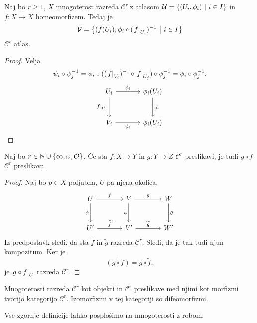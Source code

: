 \begin{trditev}
Naj bo $r \geq 1$, $X$ mnogoterost razreda $\mathcal{C}^r$ z
atlasom $\mathcal{U} = \left\{(U_i, \phi_i)~\middle\vert~i \in I\right\}$ in
$f \colon X \to X$ homeomorfizem. Tedaj je
\[
\mathcal{V} =
\left\{(f(U_i), \phi_i \circ (\left. f\right|_{U_i}^{})^{-1}~\middle\vert~i \in I\right\}
\]
$\mathcal{C}^r$ atlas.
\end{trditev}

\begin{proof}
Velja
\[
\psi_i \circ \psi_j^{-1} = \phi_i \circ
((\left. f\right|_{V_i}^{})^{-1} \circ \left. f\right|_{U_j}^{}) \circ \phi_j^{-1} =
\phi_i \circ \phi_j^{-1}.
\qedhere
\]
\[
\begin{tikzcd}[column sep=large, row sep=large]
U_i \arrow[r, "\phi_i"] \arrow[d, "\eval{f}{U_i}{}"'] &
\phi_i(U_i) \arrow[d, "\id"]
\\
V_i \arrow[r, rightarrow, "\psi_i"'] &
\phi_i(U_i)
\end{tikzcd}
\]
\end{proof}

\begin{trditev}
Naj bo $r \in \mathbb{N} \cup \left\{\infty, \omega, \mathcal{O}\right\}$. Če sta
$f \colon X \to Y$ in $g \colon Y \to Z$ $\mathcal{C}^r$
preslikavi, je tudi $g \circ f$ $\mathcal{C}^r$ preslikava.
\end{trditev}

\begin{proof}
Naj bo $p \in X$ poljubna, $U$ pa njena okolica.
\[
\begin{tikzcd}[column sep=large, row sep=large]
U \arrow[r, "f"] \arrow[d, "\phi"'] &
V \arrow[r, "g"] \arrow[d, "\psi"'] &
W \arrow[d, "\theta"]
\\
U' \arrow[r, "\widetilde{f}"] &
V' \arrow[r, "\widetilde{g}"] &
W'
\end{tikzcd}
\]
Iz predpostavk sledi, da sta $\widetilde{f}$ in $\widetilde{g}$
razreda $\mathcal{C}^r$. Sledi, da je tak tudi njun kompozitum. Ker
je
\[
\widetilde{(g \circ f)} = \widetilde{g} \circ \widetilde{f},
\]
je $\left. g \circ f\right|_{U}^{}$ razreda $\mathcal{C}^r$.
\end{proof}

\begin{posledica}
Mnogoterosti razreda $\mathcal{C}^r$ kot objekti in $\mathcal{C}^r$
preslikave med njimi kot morfizmi tvorijo kategorijo
$\mathcal{C}^r$. Izomorfizmi v tej kategoriji so difeomorfizmi.
\end{posledica}

\begin{opomba}
Vse zgornje definicije lahko posplošimo na mnogoterosti z robom.
\end{opomba}

